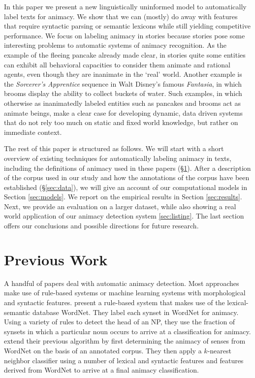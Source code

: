 \documentclass[a4paper,UKenglish]{oasics}
\begin{document}
In this paper we present a new linguistically uninformed model to
automatically label texts for animacy. We show that we can (mostly) do
away with features that require syntactic parsing or semantic lexicons
while still yielding competitive performance. We focus on labeling
animacy in stories because stories pose some interesting problems to
automatic systems of animacy recognition. As the example of the
fleeing pancake already made clear, in stories quite some entities can exhibit all behavioral
capacities to consider them animate and rational agents, even though they are inanimate in the `real' world. Another
example is the \textit{Sorcerer's Apprentice} sequence in Walt
Disney's famous \textit{Fantasia}, in which brooms display the ability
to collect buckets of water. Such examples, in which otherwise as
inanimatedly labeled entities such as pancakes and brooms act as animate beings, make a
clear case for developing dynamic, data driven systems that do not
rely too much on static and fixed world knowledge, but rather on
immediate context.

The rest of this paper is structured as follows. We will start with a
short overview of existing techniques for automatically labeling
animacy in texts, including the definitions of animacy used in these
papers (\S\ref{sec:previous-work}). After a description of the corpus
used in our study and how the annotations of the corpus have been
established (\S\ref{sec:data}), we will give an account of our
computational models in Section \ref{sec:models}. We report on the
empirical results in Section \ref{sec:results}. Next, we provide an evaluation on a larger dataset, while also showing a real world application of our animacy detection system \ref{sec:listing}.
The last section offers our conclusions and possible directions for future research.


\section{Previous Work}\label{sec:previous-work}

A handful of papers deal with automatic animacy detection. Most
approaches make use of rule-based systems or machine learning systems
with morphological and syntactic features. \cite{evans:00} present a
rule-based system that makes use of the lexical-semantic database
WordNet. They label each synset in WordNet for animacy. Using a
variety of rules to detect the head of an NP, they use the fraction of
synsets in which a particular noun occurs to arrive at a
classification for animacy. \cite{orasan:01} extend their previous
algorithm by first determining the animacy of senses from WordNet on
the basis of an annotated corpus. They then apply a $k$-nearest
neighbor classifier using a number of lexical and syntactic features
and features derived from WordNet to arrive at a final animacy
classification.
\end{document}
